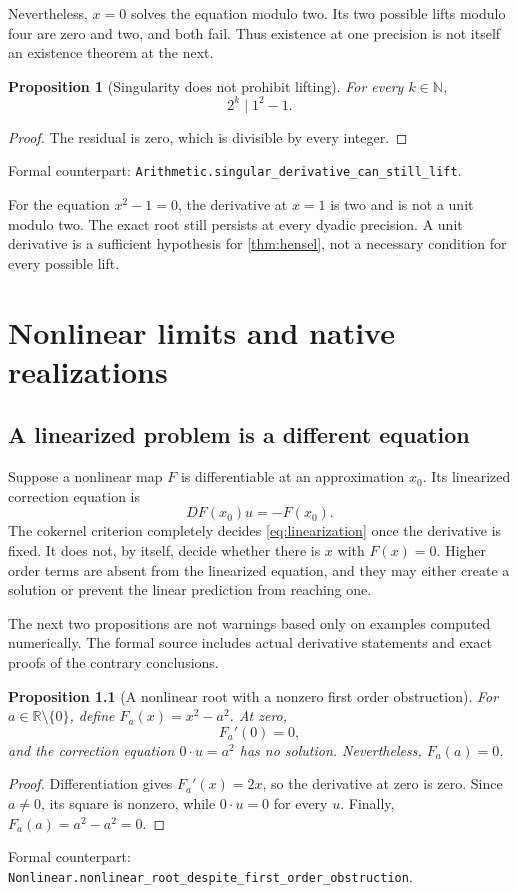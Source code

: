 \documentclass[11pt,letterpaper,oneside,openany]{book}
\theoremstyle{quiet}
\newtheorem{proposition}[theorem]{Proposition}
\newcommand{\R}{\mathbb{R}}
\newcommand{\N}{\mathbb{N}}
\newcommand{\formal}[1]{\par\nobreak\begingroup\footnotesize\color{Slate}\sffamily Formal counterpart: \normalfont\nolinkurl{#1}.\par\endgroup}
\begin{document}
Nevertheless, $x=0$ solves the equation modulo two. Its two possible lifts modulo four are zero and two, and both fail. Thus existence at one precision is not itself an existence theorem at the next.

\begin{proposition}[Singularity does not prohibit lifting]\label{prop:singular-success}
For every $k\in\N$,
\[
2^k\mid 1^2-1.
\]
\end{proposition}
\begin{proof}
The residual is zero, which is divisible by every integer.
\end{proof}
\formal{Arithmetic.singular_derivative_can_still_lift}

For the equation $x^2-1=0$, the derivative at $x=1$ is two and is not a unit modulo two. The exact root still persists at every dyadic precision. A unit derivative is a sufficient hypothesis for \cref{thm:hensel}, not a necessary condition for every possible lift.

\chapter{Nonlinear limits and native realizations}\label{ch:limits}
\section{A linearized problem is a different equation}
Suppose a nonlinear map $F$ is differentiable at an approximation $x_0$. Its linearized correction equation is
\begin{equation}\label{eq:linearization}
DF(x_0)u=-F(x_0).
\end{equation}
The cokernel criterion completely decides \eqref{eq:linearization} once the derivative is fixed. It does not, by itself, decide whether there is $x$ with $F(x)=0$. Higher order terms are absent from the linearized equation, and they may either create a solution or prevent the linear prediction from reaching one.

The next two propositions are not warnings based only on examples computed numerically. The formal source includes actual derivative statements and exact proofs of the contrary conclusions.

\begin{proposition}[A nonlinear root with a nonzero first order obstruction]\label{prop:nonlinear-root}
For $a\in\R\setminus\{0\}$, define $F_a(x)=x^2-a^2$. At zero,
\[
F_a'(0)=0,
\]
and the correction equation $0\cdot u=a^2$ has no solution. Nevertheless, $F_a(a)=0$.
\end{proposition}
\begin{proof}
Differentiation gives $F_a'(x)=2x$, so the derivative at zero is zero. Since $a\ne0$, its square is nonzero, while $0\cdot u=0$ for every $u$. Finally, $F_a(a)=a^2-a^2=0$.
\end{proof}
\formal{Nonlinear.nonlinear_root_despite_first_order_obstruction}
\end{document}
